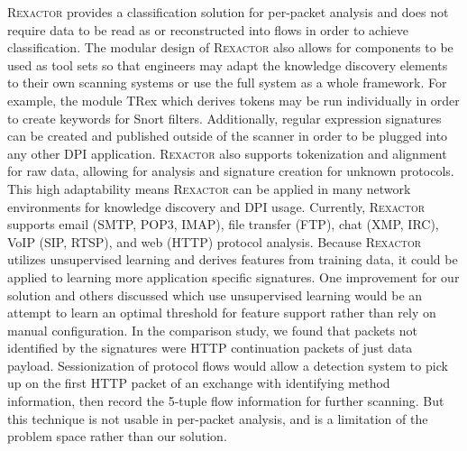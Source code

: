 \textsc{Rexactor} provides a classification solution for per-packet analysis and does not require data to be read as or reconstructed into flows in order to achieve classification. The modular design of \textsc{Rexactor} also allows for components to be used as tool sets so that engineers may adapt the knowledge discovery elements to their own scanning systems or use the full system as a whole framework. For example, the module TRex which derives tokens may be run individually in order to create keywords for Snort filters. Additionally, regular expression signatures can be created and published outside of the scanner in order to be plugged into any other DPI application. \textsc{Rexactor} also supports tokenization and alignment for raw data, allowing for analysis and signature creation for unknown protocols. This high adaptability means \textsc{Rexactor} can be applied in many network environments for knowledge discovery and DPI usage.
Currently, \textsc{Rexactor} supports email (SMTP, POP3, IMAP), file transfer (FTP), chat (XMP, IRC), VoIP (SIP, RTSP), and web (HTTP) protocol analysis. Because \textsc{Rexactor} utilizes unsupervised learning and derives features from training data, it could be applied to learning more application specific signatures. One improvement for our solution and others discussed which use unsupervised learning would be an attempt to learn an optimal threshold for feature support rather than rely on manual configuration. In the comparison study, we found that packets not identified by the signatures were HTTP continuation packets of just data payload. Sessionization of protocol flows would allow a detection system to pick up on the first HTTP packet of an exchange with identifying method information, then record the 5-tuple flow information for further scanning. But this technique is not usable in per-packet analysis, and is a limitation of the problem space rather than our solution.


